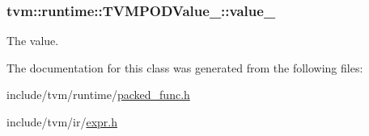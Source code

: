 \subsubsection[{\texorpdfstring{value\+\_\+}{value_}}]{ tvm\+::runtime\+::\+T\+V\+M\+P\+O\+D\+Value\+\_\+\+::value\+\_\+\hspace{0.3cm}{\ttfamily [protected]}}\hypertarget{classtvm_1_1runtime_1_1TVMPODValue___a8ffdfcc7099faf19ee07a5c03ce06af8}{}\label{classtvm_1_1runtime_1_1TVMPODValue___a8ffdfcc7099faf19ee07a5c03ce06af8}


The value. 



The documentation for this class was generated from the following files\+:\begin{DoxyCompactItemize}
\item 
include/tvm/runtime/\hyperlink{packed__func_8h}{packed\+\_\+func.\+h}\item 
include/tvm/ir/\hyperlink{ir_2expr_8h}{expr.\+h}\end{DoxyCompactItemize}
